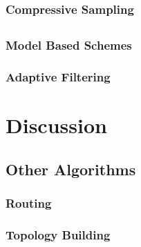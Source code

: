 \subsubsection{Compressive Sampling}
\label{sec:Compressive Sampling}


\subsection{\catII}
\label{sec:catII}

\subsubsection{Model Based Schemes}
\label{sec:Model Based Schemes}


\subsubsection{Adaptive Filtering}
\label{sec:Adaptive Filtering}

\subsection{\catIII}
\label{sec:catIII}


\section{Discussion}
\label{sec:Discussion}


\subsection{Other Algorithms}
\label{sec:Listings}

\subsubsection{Routing}
\label{sec:Listings}

\subsubsection{Topology Building}
\label{sec:Listings}


